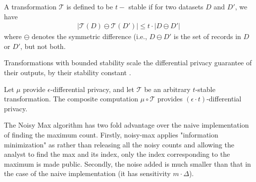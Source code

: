 \begin{definition}A transformation $\mathcal{T}$ is defined to be $t-$ stable if for two datasets $D$ and $D'$, we have\begin{gather}|\mathcal{T}(D)\ominus \mathcal{T}(D')| \leq t \cdot |D\ominus D'|  \end{gather} where $\ominus$ denotes the symmetric difference (i.e.,  $D \ominus D'$ is the set of records in $D$ or $D'$, but not both. \end{definition}
Transformations with bounded stability scale the differential privacy guarantee of their outputs, by their stability constant \cite{PINQ}.
\begin{theorem}
Let $\mu$ provide $\epsilon$-differential privacy, and let $\mathcal{T}$
be an arbitrary $t$-stable transformation. The composite computation $\mu \circ \mathcal{T}$ provides $(\epsilon \cdot t)$-differential privacy.\end{theorem}
The Noisy Max algorithm has two fold advantage over the naive implementation of finding the maximum count.
Firstly, noisy-max applies "information minimization" as rather than releasing all the noisy counts
and allowing the analyst to find the max and its index, only the
index corresponding to the maximum is made public.
Secondly, the noise added is much smaller than that in the case of the naive implementation (it has sensitivity $m\cdot \Delta$).